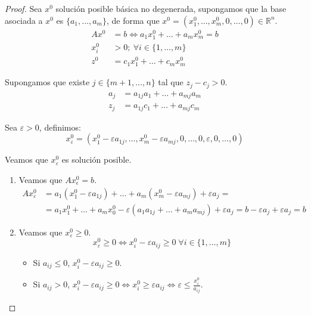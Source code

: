 \begin{proof}
    Sea $x^0$ solución posible básica no degenerada, supongamos que la base asociada a $x^0$ es $\{a_1, \dots, a_m\}$, de forma que $x^0 = (x^0_1, \dots, x^0_m, 0, \dots, 0) \in \mathbb{R}^n$.
    \begin{align*}
        Ax^0  & = b \Leftrightarrow a_1x^0_1 + \dots + a_mx^0_m = b \\
        x^0_i & > 0 ;\ \forall i \in \{1, \dots, m\}                \\
        z^0   & = c_1x^0_1 + \dots + c_mx^0_m
    \end{align*}

    Supongamos que existe $j \in \{m+1, \dots, n\}$ tal que $z_j - c_j > 0$.
    \begin{align*}
        a_j & = a_{1j}a_1 + \dots + a_{mj}a_m \\
        z_j & = a_{1j}c_1 + \dots + a_{mj}c_m
    \end{align*}

    Sea $\varepsilon > 0$, definimos:
    $$x^0_\varepsilon = (x^0_1 - \varepsilon a_{1j}, \dots, x^0_m - \varepsilon a_{mj}, 0, \dots, 0, \varepsilon, 0, \dots, 0)$$

    Veamos que $x^0_\varepsilon$ es solución posible.
    \begin{enumerate}
        \item Veamos que $Ax^0_\epsilon = b$.
              \begin{align*}
                  Ax^0_\varepsilon & = a_1(x^0_1 - \varepsilon a_{1j}) + \dots + a_m(x^0_m - \varepsilon a_{mj}) + \varepsilon a_j = \\
                                   & = a_1x^0_1 + \dots + a_mx^0_0 - \varepsilon (a_1a_{1j} + \dots + a_ma_{mj}) + \varepsilon a_j = b - \varepsilon a_j + \varepsilon a_j = b
              \end{align*}
        \item Veamos que $x^0_\varepsilon \geq 0$.
              $$x^0_\varepsilon \geq 0 \Leftrightarrow x^0_i - \varepsilon a_{ij} \geq 0 \; \forall i \in \{1, \dots, m\}$$
              \begin{itemize}
                  \item Si $a_{ij} \leq 0$, $x^0_i - \varepsilon a_{ij} \geq 0$.
                  \item Si $a_{ij} > 0$, $x^0_i - \varepsilon a_{ij} \geq 0 \Leftrightarrow x^0_i \geq \varepsilon a_{ij} \Leftrightarrow \varepsilon \leq \frac{x^0_i}{a_{ij}}$.
              \end{itemize}
    \end{enumerate}


\end{proof}
